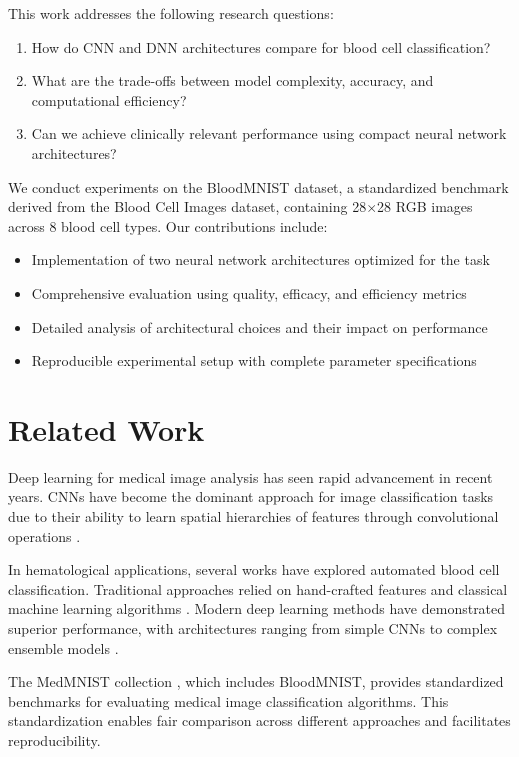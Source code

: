 \documentclass[runningheads]{llncs}
\begin{document}
This work addresses the following research questions:
\begin{enumerate}
    \item How do CNN and DNN architectures compare for blood cell classification?
    \item What are the trade-offs between model complexity, accuracy, and computational efficiency?
    \item Can we achieve clinically relevant performance using compact neural network architectures?
\end{enumerate}

We conduct experiments on the BloodMNIST dataset, a standardized benchmark derived from the Blood Cell Images dataset, containing 28$\times$28 RGB images across 8 blood cell types. Our contributions include:
\begin{itemize}
    \item Implementation of two neural network architectures optimized for the task
    \item Comprehensive evaluation using quality, efficacy, and efficiency metrics
    \item Detailed analysis of architectural choices and their impact on performance
    \item Reproducible experimental setup with complete parameter specifications
\end{itemize}

\section{Related Work}

Deep learning for medical image analysis has seen rapid advancement in recent years. CNNs have become the dominant approach for image classification tasks due to their ability to learn spatial hierarchies of features through convolutional operations \cite{krizhevsky2012imagenet}.

In hematological applications, several works have explored automated blood cell classification. Traditional approaches relied on hand-crafted features and classical machine learning algorithms \cite{habibzadeh2011comparative}. Modern deep learning methods have demonstrated superior performance, with architectures ranging from simple CNNs to complex ensemble models \cite{acevedo2020recognition}.

The MedMNIST collection \cite{yang2021medmnist}, which includes BloodMNIST, provides standardized benchmarks for evaluating medical image classification algorithms. This standardization enables fair comparison across different approaches and facilitates reproducibility.
\end{document}
